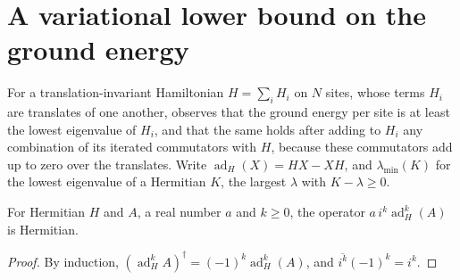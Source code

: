 \section{A variational lower bound on the ground energy}
\label{sec:hastings_variational_lower_bound}


For a translation-invariant Hamiltonian $H=\sum_iH_i$ on $N$ sites, whose terms
$H_i$ are translates of one another, \cite{Hastings2006Solving} observes that the
ground energy per site is at least the lowest eigenvalue of $H_i$, and that the
same holds after adding to $H_i$ any combination of its iterated commutators
with $H$, because these commutators add up to zero over the translates. Write
$\operatorname{ad}_H(X)=HX-XH$, and $\lambda_{\min}(K)$ for the lowest eigenvalue
of a Hermitian $K$, the largest $\lambda$ with $K-\lambda\ge0$.

\begin{lemma}
    \label{thm:hastings_commutator_iter_hermitian}
    \leanok
    For Hermitian $H$ and $A$, a real number $a$ and $k\ge0$, the operator
    $a\,i^k\operatorname{ad}_H^k(A)$ is Hermitian.
\end{lemma}
\begin{proof}\leanok
    By induction, $(\operatorname{ad}_H^kA)^\dagger=(-1)^k\operatorname{ad}_H^k(A)$,
    and $\overline{i^k}(-1)^k=i^k$.
\end{proof}

